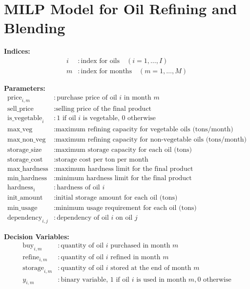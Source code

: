 \documentclass{article}
\begin{document}
\section*{MILP Model for Oil Refining and Blending}

\textbf{Indices:}
\begin{align*}
i & : \text{index for oils} \quad (i = 1, \ldots, I) \\
m & : \text{index for months} \quad (m = 1, \ldots, M)
\end{align*}

\textbf{Parameters:}
\begin{align*}
\text{price}_{i,m} & : \text{purchase price of oil } i \text{ in month } m \\
\text{sell\_price} & : \text{selling price of the final product} \\
\text{is\_vegetable}_i & : \text{1 if oil } i \text{ is vegetable, 0 otherwise} \\
\text{max\_veg} & : \text{maximum refining capacity for vegetable oils (tons/month)} \\
\text{max\_non\_veg} & : \text{maximum refining capacity for non-vegetable oils (tons/month)} \\
\text{storage\_size} & : \text{maximum storage capacity for each oil (tons)} \\
\text{storage\_cost} & : \text{storage cost per ton per month} \\
\text{max\_hardness} & : \text{maximum hardness limit for the final product} \\
\text{min\_hardness} & : \text{minimum hardness limit for the final product} \\
\text{hardness}_i & : \text{hardness of oil } i \\
\text{init\_amount} & : \text{initial storage amount for each oil (tons)} \\
\text{min\_usage} & : \text{minimum usage requirement for each oil (tons)} \\
\text{dependency}_{i,j} & : \text{dependency of oil } i \text{ on oil } j
\end{align*}

\textbf{Decision Variables:}
\begin{align*}
\text{buy}_{i,m} & : \text{quantity of oil } i \text{ purchased in month } m \\
\text{refine}_{i,m} & : \text{quantity of oil } i \text{ refined in month } m \\
\text{storage}_{i,m} & : \text{quantity of oil } i \text{ stored at the end of month } m \\
y_{i,m} & : \text{binary variable, 1 if oil } i \text{ is used in month } m, 0 \text{ otherwise}
\end{align*}
\end{document}
